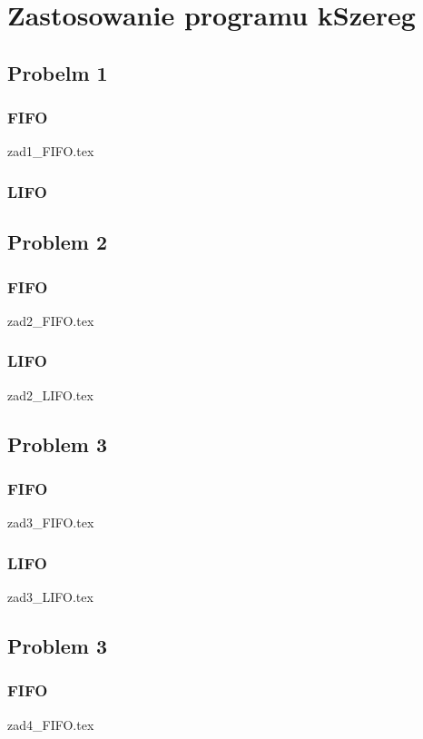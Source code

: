 \documentclass[twoside]{kInzynierka}
\begin{document}
   
\section      %
                {Zastosowanie programu kSzereg}
       
\subsection     {Probelm 1}
\subsubsection  {FIFO}
 {zad1_FIFO.tex}
\subsubsection  {LIFO}


\newpage
\subsection     {Problem 2}
\subsubsection  {FIFO}
 {zad2_FIFO.tex}
\subsubsection  {LIFO}
 {zad2_LIFO.tex}

\newpage
\subsection     {Problem 3}
\subsubsection  {FIFO}
 {zad3_FIFO.tex}
\subsubsection  {LIFO}
 {zad3_LIFO.tex}

\newpage
\subsection     {Problem 3}
\subsubsection  {FIFO}
 {zad4_FIFO.tex}
\end{document}
